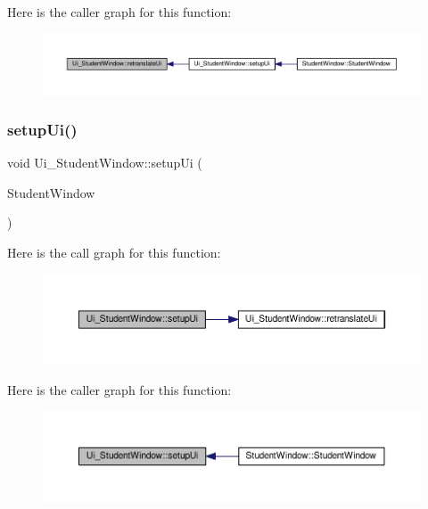 Here is the caller graph for this function\+:
\nopagebreak
\begin{figure}[H]
\begin{center}
\leavevmode
\includegraphics[width=350pt]{class_ui___student_window_a1fc2da528074f28be5f44ef85b95085f_icgraph}
\end{center}
\end{figure}
\mbox{\label{class_ui___student_window_a6ce5b9fe4f5173fbc3d56bcaea852f9e}} 
\subsubsection{\texorpdfstring{setup\+Ui()}{setupUi()}}
{\footnotesize\ttfamily void Ui\+\_\+\+Student\+Window\+::setup\+Ui (\begin{DoxyParamCaption}\item[{Q\+Main\+Window $\ast$}]{Student\+Window }\end{DoxyParamCaption})\hspace{0.3cm}{\ttfamily [inline]}}

Here is the call graph for this function\+:
\nopagebreak
\begin{figure}[H]
\begin{center}
\leavevmode
\includegraphics[width=350pt]{class_ui___student_window_a6ce5b9fe4f5173fbc3d56bcaea852f9e_cgraph}
\end{center}
\end{figure}
Here is the caller graph for this function\+:
\nopagebreak
\begin{figure}[H]
\begin{center}
\leavevmode
\includegraphics[width=350pt]{class_ui___student_window_a6ce5b9fe4f5173fbc3d56bcaea852f9e_icgraph}
\end{center}
\end{figure}


